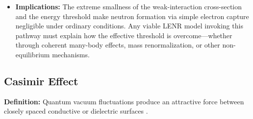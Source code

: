 \documentclass[11pt,a4paper]{article}
\begin{document}
\begin{itemize}
  \begin{equation}
R = n_p \, n_e \, \langle \sigma v \rangle
\end{equation}

  where $n_p$ and $n_e$ are the proton and electron number densities and the thermal average $\langle \sigma v \rangle$ accounts for the energy threshold. For standard thermal electrons, the Boltzmann suppression factor $\exp(-\Delta E / k_B T) \sim \exp(-0.782 \text{ MeV} / 0.026 \text{ eV}) \sim e^{-3 \times 10^{4}}$ renders this rate effectively zero, underscoring that some non-equilibrium or collective mechanism is required if this process is to contribute meaningfully to LENR.
\item
  \textbf{Implications:} The extreme smallness of the weak-interaction cross-section and the energy threshold make neutron formation via simple electron capture negligible under ordinary conditions. Any viable LENR model invoking this pathway must explain how the effective threshold is overcome---whether through coherent many-body effects, mass renormalization, or other non-equilibrium mechanisms.
\end{itemize}

\subsection{Casimir Effect}

\textbf{Definition:} Quantum vacuum fluctuations produce an attractive force between closely spaced conductive or dielectric surfaces \citep{bordag2001}.
\end{document}
